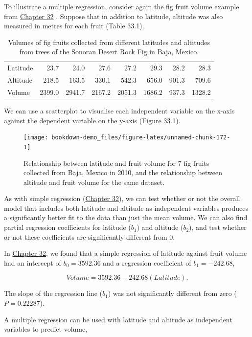 \documentclass[
]{scrbook}
\begin{document}
To illustrate a multiple regression, consider again the fig fruit volume example from \protect\hyperlink{Chapter_32}{Chapter 32} \citep{Duthie2016}.
Suppose that in addition to latitude, altitude was also measured in metres for each fruit (Table 33.1).

\begin{longtable}[]{@{}lrrrrrrr@{}}
\caption{\label{tab:unnamed-chunk-171}Volumes of fig fruits collected from different latitudes and altitudes from trees of the Sonoran Desert Rock Fig in Baja, Mexico.}\tabularnewline
\toprule
\endhead
Latitude & 23.7 & 24.0 & 27.6 & 27.2 & 29.3 & 28.2 & 28.3 \\
Altitude & 218.5 & 163.5 & 330.1 & 542.3 & 656.0 & 901.3 & 709.6 \\
Volume & 2399.0 & 2941.7 & 2167.2 & 2051.3 & 1686.2 & 937.3 & 1328.2 \\
\bottomrule
\end{longtable}

We can use a scatterplot to visualise each independent variable on the x-axis against the dependent variable on the y-axis (Figure 33.1).

\begin{figure}
\texttt{[image: bookdown-demo\_files/figure-latex/unnamed-chunk-172-1]} \caption{Relationship between latitude and fruit volume for 7 fig fruits collected from Baja, Mexico in 2010, and the relationship between altitude and fruit volume for the same dataset. }\label{fig:unnamed-chunk-172}
\end{figure}

As with simple regression (\protect\hyperlink{Chapter_32}{Chapter 32}), we can test whether or not the overall model that includes both latitude and altitude as independent variables produces a significantly better fit to the data than just the mean volume.
We can also find partial regression coefficients for latitude (\(b_{1}\)) and altitude (\(b_{2}\)), and test whether or not these coefficients are significantly different from 0.

In \protect\hyperlink{Chapter_32}{Chapter 32}, we found that a simple regression of latitude against fruit volume had an intercept of \(b_{0} = 3592.36\) and a regression coefficient of \(b_{1} = -242.68\),

\[Volume = 3592.36 - 242.68(Latitude).\]

The slope of the regression line (\(b_{1}\)) was not significantly different from zero (\(P = 0.22287\)).

A multiple regression can be used with latitude and altitude as independent variables to predict volume,
\end{document}
